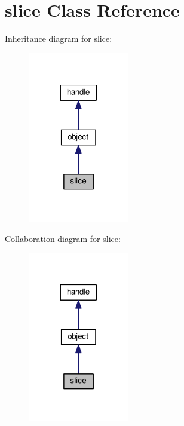 \hypertarget{classslice}{}\section{slice Class Reference}
\label{classslice}


Inheritance diagram for slice\+:
\nopagebreak
\begin{figure}[H]
\begin{center}
\leavevmode
\includegraphics[width=125pt]{classslice__inherit__graph}
\end{center}
\end{figure}


Collaboration diagram for slice\+:
\nopagebreak
\begin{figure}[H]
\begin{center}
\leavevmode
\includegraphics[width=125pt]{classslice__coll__graph}
\end{center}
\end{figure}
